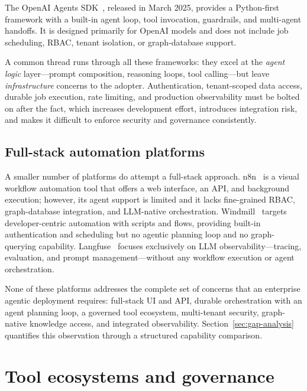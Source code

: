 \documentclass[a4paper,noexaminfo]{sapthesis}
\begin{document}
The OpenAI Agents SDK~\cite{openaiagentssdk2025}, released in March 2025,
provides a Python-first framework with a built-in agent loop, tool
invocation, guardrails, and multi-agent handoffs.  It is designed primarily
for OpenAI models and does not include job scheduling, RBAC, tenant
isolation, or graph-database support.

A common thread runs through all these frameworks: they excel at the
\emph{agent logic} layer---prompt composition, reasoning loops, tool
calling---but leave \emph{infrastructure} concerns to the adopter.
Authentication, tenant-scoped data access, durable job execution, rate
limiting, and production observability must be bolted on after the fact,
which increases development effort, introduces integration risk, and makes
it difficult to enforce security and governance consistently.

\subsection{Full-stack automation platforms}

A smaller number of platforms do attempt a full-stack approach.
n8n~\cite{n8n2023} is a visual workflow automation tool that offers a web
interface, an API, and background execution; however, its agent support is
limited and it lacks fine-grained RBAC, graph-database integration, and
LLM-native orchestration.  Windmill~\cite{windmill2023} targets
developer-centric automation with scripts and flows, providing built-in
authentication and scheduling but no agentic planning loop and no
graph-querying capability.  Langfuse~\cite{langfuse2023} focuses
exclusively on LLM observability---tracing, evaluation, and prompt
management---without any workflow execution or agent orchestration.

None of these platforms addresses the complete set of concerns that an
enterprise agentic deployment requires: full-stack UI and API, durable
orchestration with an agent planning loop, a governed tool ecosystem,
multi-tenant security, graph-native knowledge access, and integrated
observability.  Section~\ref{sec:gap-analysis} quantifies this observation
through a structured capability comparison.

\section{Tool ecosystems and governance}
\label{sec:tool-ecosystems}
\end{document}
